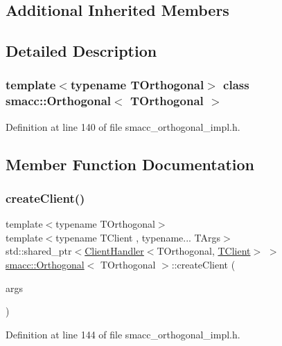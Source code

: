 \subsection*{Additional Inherited Members}


\subsection{Detailed Description}
\subsubsection*{template$<$typename T\+Orthogonal$>$\newline
class smacc\+::\+Orthogonal$<$ T\+Orthogonal $>$}



Definition at line 140 of file smacc\+\_\+orthogonal\+\_\+impl.\+h.



\subsection{Member Function Documentation}
\mbox{\label{classsmacc_1_1Orthogonal_aea19bfe584fe9c9580784a24b4690eab}} 
\subsubsection{\texorpdfstring{create\+Client()}{createClient()}}
{\footnotesize\ttfamily template$<$typename T\+Orthogonal$>$ \\
template$<$typename T\+Client , typename... T\+Args$>$ \\
std\+::shared\+\_\+ptr$<$\hyperlink{classsmacc_1_1ClientHandler}{Client\+Handler}$<$T\+Orthogonal, \hyperlink{classTClient}{T\+Client}$>$ $>$ \hyperlink{classsmacc_1_1Orthogonal}{smacc\+::\+Orthogonal}$<$ T\+Orthogonal $>$\+::create\+Client (\begin{DoxyParamCaption}\item[{T\+Args...}]{args }\end{DoxyParamCaption})\hspace{0.3cm}{\ttfamily [inline]}}



Definition at line 144 of file smacc\+\_\+orthogonal\+\_\+impl.\+h.


